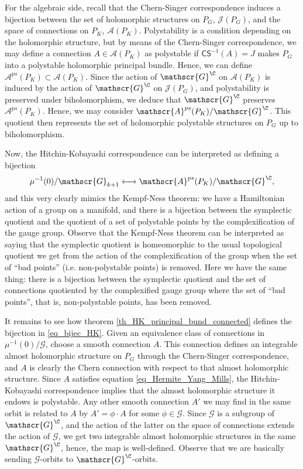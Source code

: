 For the algebraic side, recall that the Chern-Singer correspondence induces a bijection between the set of holomorphic structures on \(P_G\), \(\mathscr{J}(P_G)\), and the space of connections on \(P_K\), \(\mathscr{A}(P_K)\). Polystability is a condition depending on the holomorphic structure, but by means of the Chern-Singer correspondence, we may define a connection \(A \in \mathscr{A}(P_K)\) as polystable if \(\mathsf{CS}^{-1}(A)=J\) makes \(P_G\) into a polystable holomorphic principal bundle. Hence, we can define \(\mathscr{A}^{ps}(P_K) \subset \mathscr{A}(P_K)\). Since the action of \(\mathscr{G}^\C\) on \(\mathscr{A}(P_K)\) is induced by the action of \(\mathscr{G}^\C\) on \(\mathscr{J}(P_G)\), and polystability is preserved under biholomorphism, we deduce that \(\mathscr{G}^\C\) preserves \(\mathscr{A}^{ps}(P_K)\). Hence, we may consider \(\mathscr{A}^{ps}(P_K)/\mathscr{G}^\C\). This quotient then represents the set of holomorphic polystable structures on \(P_G\) up to biholomorphism. 

Now, the Hitchin-Kobayashi correspondence can be interpreted as defining a bijection
\begin{equation} \label{eq_bijec_HK}
\mu^{-1}(0)/\mathscr{G}_{k+1} \longleftrightarrow \mathscr{A}^{ps}(P_K)/\mathscr{G}^\C,
\end{equation}
and this very clearly mimics the Kempf-Ness theorem: we have a Hamiltonian action of a group on a manifold, and there is a bijection between the symplectic quotient and the quotient of a set of polystable points by the complexification of the gauge group. Observe that the Kempf-Ness theorem can be interpreted as saying that the symplectic quotient is homeomorphic to the usual topological quotient we get from the action of the complexification of the group when the set of ``bad points'' (i.e. non-polystable points) is removed. Here we have the same thing: there is a bijection between the symplectic quotient and the set of connections quotiented by the complexified gauge group where the set of ``bad points'', that is, non-polystable points, has been removed.

It remains to see how theorem \ref{th_HK_principal_bund_connected} defines the bijection in \eqref{eq_bijec_HK}. Given an equivalence class of connections in \(\mu^{-1}(0)/\mathscr{G}\), choose a smooth connection \(A\). This connection defines an integrable almost holomorphic structure on \(P_G\) through the Chern-Singer correspondence, and \(A\) is clearly the Chern connection with respect to that almost holomorphic structure. Since \(A\) satisfies equation \eqref{eq_Hermite_Yang_Mills}, the Hitchin-Kobayashi correspondence implies that the almost holomorphic structure it endows is polystable. Any other smooth connection \(A'\) we may find in the same orbit is related to \(A\) by \(A'=\phi \cdot A\) for some \(\phi \in \mathscr{G}\). Since \(\mathscr{G}\) is a subgroup of \(\mathscr{G}^\C\), and the action of the latter on the space of connections extends the action of \(\mathscr{G}\), we get two integrable almost holomorphic structures in the same \(\mathscr{G}^\C\), hence, the map is well-defined. Observe that we are basically sending \(\mathscr{G}\)-orbits to \(\mathscr{G}^\C\)-orbits. 

